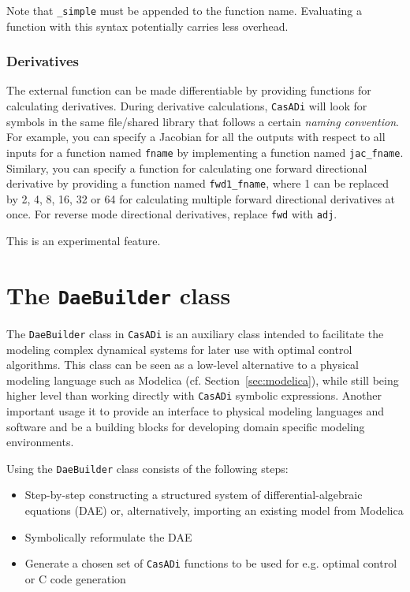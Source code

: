 \documentclass[a4paper,12pt]{book}
\newcommand{\CasADi}{\texttt{CasADi}\xspace}
\begin{document}
Note that \verb|_simple| must be appended to the function name. Evaluating
a function with this syntax potentially carries less overhead.

\subsection*{Derivatives}
The external function can be made differentiable by providing functions for
calculating derivatives. During derivative calculations, \CasADi will look for
symbols in the same file/shared library that follows a certain
\emph{naming convention}. For example, you can specify a Jacobian for all the
outputs with respect to all inputs for a function named \verb|fname| by
implementing a function named \verb|jac_fname|. Similary, you can specify
a function for calculating one forward directional derivative by providing a
function named \verb|fwd1_fname|, where 1 can be replaced by 2, 4, 8, 16,
32 or 64 for calculating multiple forward directional derivatives at once.
For reverse mode directional derivatives, replace \verb|fwd| with \verb|adj|.

This is an experimental feature.

\chapter{The \texttt{DaeBuilder} class} \label{ch:daebuilder}
The \texttt{DaeBuilder} class in \CasADi is an auxiliary class intended to
facilitate the modeling complex dynamical systems for later use with optimal
control algorithms. This class can be seen as a low-level alternative to
a physical modeling language such as Modelica (cf. Section~\ref{sec:modelica}),
while still being higher level than working directly with \CasADi symbolic
expressions. Another important usage it to provide an interface to
physical modeling languages and software and be a building blocks for
developing domain specific modeling environments.

Using the \texttt{DaeBuilder} class consists of the following steps:
\begin{itemize}
  \item Step-by-step constructing a structured system of differential-algebraic
  equations (DAE) or, alternatively, importing an existing model from Modelica
  \item Symbolically reformulate the DAE
  \item Generate a chosen set of \CasADi functions to be used for e.g. optimal
  control or C code generation
\end{itemize}
\end{document}
